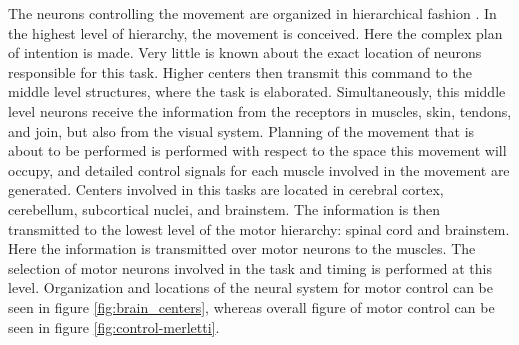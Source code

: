 The neurons controlling the movement are organized in hierarchical fashion \citep{Widmaier2014}. In the highest level of hierarchy, the movement is conceived. Here the complex plan of intention is made. Very little is known about the exact location of neurons responsible for this task. Higher centers then transmit this command to the middle level structures, where the task is elaborated. Simultaneously, this middle level neurons receive the information from the receptors in muscles, skin, tendons, and join, but also from the visual system. Planning of the movement that is about to be performed is performed with respect to the space this movement will occupy, and detailed control signals for each muscle involved in the movement are generated. Centers involved in this tasks are located in cerebral cortex, cerebellum, subcortical nuclei, and brainstem. The information is then transmitted to the lowest level of the motor hierarchy: spinal cord and brainstem. Here the information is transmitted over motor neurons to the muscles. The selection of motor neurons involved in the task and timing is performed at this level. Organization and locations of the neural system for motor control can be seen in figure \ref{fig:brain_centers}, whereas overall figure of motor control can be seen in figure \ref{fig:control-merletti}.
